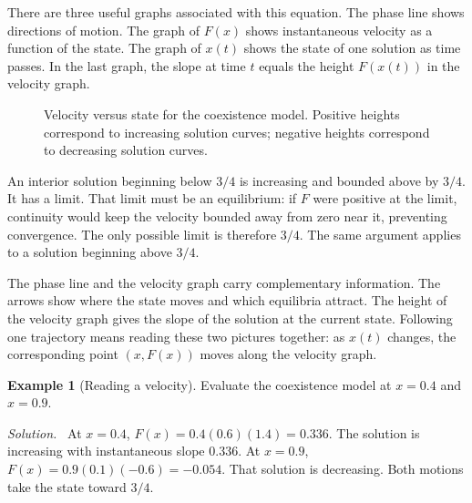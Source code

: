 \documentclass[11pt,oneside,openany]{book}
\theoremstyle{definition}
\newtheorem{example}{Example}[chapter]
\theoremstyle{remark}
\newenvironment{solution}{\par\smallskip\noindent\textit{Solution.}\ }{\par\smallskip}
\numberwithin{equation}{chapter}
\begin{document}
There are three useful graphs associated with this equation. The phase line shows directions of motion. The graph of $F(x)$ shows instantaneous velocity as a function of the state. The graph of $x(t)$ shows the state of one solution as time passes. In the last graph, the slope at time $t$ equals the height $F(x(t))$ in the velocity graph.

\begin{figure}[htbp]
\centering
{}
\caption{Velocity versus state for the coexistence model. Positive heights correspond to increasing solution curves; negative heights correspond to decreasing solution curves.}
\end{figure}

An interior solution beginning below $3/4$ is increasing and bounded above by $3/4$. It has a limit. That limit must be an equilibrium: if $F$ were positive at the limit, continuity would keep the velocity bounded away from zero near it, preventing convergence. The only possible limit is therefore $3/4$. The same argument applies to a solution beginning above $3/4$.

The phase line and the velocity graph carry complementary information. The arrows show where the state moves and which equilibria attract. The height of the velocity graph gives the slope of the solution at the current state. Following one trajectory means reading these two pictures together: as $x(t)$ changes, the corresponding point $(x,F(x))$ moves along the velocity graph.

\begin{example}[Reading a velocity]
Evaluate the coexistence model at $x=0.4$ and $x=0.9$.
\begin{solution}
At $x=0.4$, $F(x)=0.4(0.6)(1.4)=0.336$. The solution is increasing with instantaneous slope $0.336$. At $x=0.9$, $F(x)=0.9(0.1)(-0.6)=-0.054$. That solution is decreasing. Both motions take the state toward $3/4$.
\end{solution}
\end{example}
\end{document}
